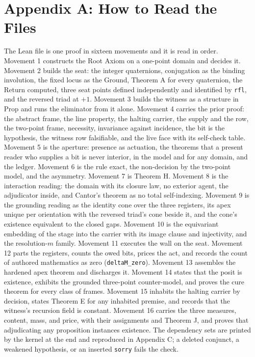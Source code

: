 \documentclass[10pt]{article}
\begin{document}
\hypertarget{appendix-a-how-to-read-the-files}{%
\twocolumn
\section{Appendix A: How to Read the
Files}\label{appendix-a-how-to-read-the-files}}

The Lean file is one proof in sixteen movements and it is read in order.
Movement 1 constructs the Root Axiom on a one-point domain and decides
it. Movement 2 builds the seat: the integer quaternions, conjugation as
the binding involution, the fixed locus as the Ground, Theorem A for
every quaternion, the Return computed, three seat points defined
independently and identified by \texttt{rfl}, and the reversed triad at
\(+1\). Movement 3 builds the witness as a structure in Prop and runs
the eliminator from it alone. Movement 4 carries the prior proof: the
abstract frame, the line property, the halting carrier, the supply and
the row, the two-point frame, necessity, invariance against incidence,
the bit is the hypothesis, the witness row falsifiable, and the live
face with its self-check table. Movement 5 is the aperture: presence as
actuation, the theorems that a present reader who supplies a bit is
never interior, in the model and for any domain, and the ledger.
Movement 6 is the rule exact, the non-decision by the two-point model,
and the asymmetry. Movement 7 is Theorem H. Movement 8 is the
interaction reading: the domain with its closure law, no exterior agent,
the adjudicator inside, and Cantor's theorem as no total self-indexing.
Movement 9 is the grounding reading as the identity cone over the three
registers, its apex unique per orientation with the reversed triad's
cone beside it, and the cone's existence equivalent to the closed gaps.
Movement 10 is the equivariant embedding of the stage into the carrier
with its image clause and injectivity, and the resolution-\(m\) family.
Movement 11 executes the wall on the seat. Movement 12 parts the
registers, counts the owed bits, prices the act, and records the count
of authored mathematics as zero (\texttt{deltaM\_\allowbreak zero}).
Movement 13 assembles the hardened apex theorem and discharges it.
Movement 14 states that the posit is existence, exhibits the grounded
three-point counter-model, and proves the cure theorem for every class
of frames. Movement 15 inhabits the halting carrier by decision, states
Theorem E for any inhabited premise, and records that the witness's
recursion field is constant. Movement 16 carries the three measures,
content, mass, and price, with their assignments and Theorem J, and
proves that adjudicating any proposition instances existence. The
dependency sets are printed by the kernel at the end and reproduced in
Appendix C; a deleted conjunct, a weakened hypothesis, or an inserted
\texttt{sorry} fails the check.
\end{document}
